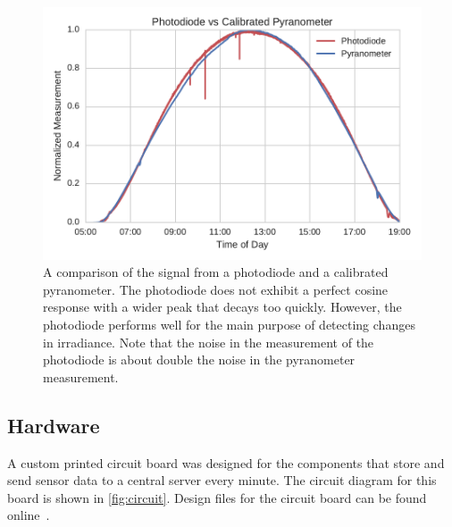\begin{figure}[h]
\includegraphics[width=\textwidth]{figs/pdvspy.pdf}
\caption[Comparison of photodiode and pyranometer signals]{A
  comparison of the signal from a photodiode and a calibrated
  pyranometer. The photodiode does not exhibit a perfect cosine
  response with a wider peak that decays too quickly. However, the
  photodiode performs well for the main purpose of detecting changes
  in irradiance. Note that the noise in the measurement of the
  photodiode is about double the noise in the pyranometer measurement.}
\label{fig:pdshape}
\end{figure}

\subsection{Hardware}
\label{sec:senshardware}
A custom printed circuit board was designed for the components that
store and send sensor data to a central server every minute.
The circuit diagram for this board is shown in \cref{fig:circuit}.
Design files for the circuit board can be found online~\cite{Lorenzo2017a}.

